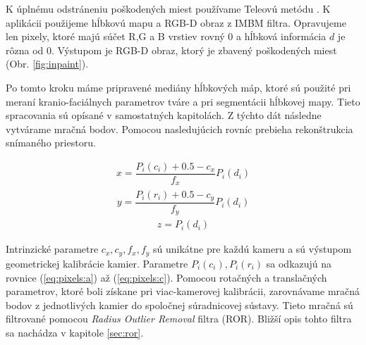 K úplnému odstráneniu poškodených miest používame Teleovú metódu \cite{telea2004image}. K aplikácii použijeme hĺbkovú mapu a RGB-D obraz z IMBM filtra. Opravujeme len pixely, ktoré majú súčet R,G a B vrstiev rovný 0 a hĺbková informácia $d$ je rôzna od 0. Výstupom je RGB-D obraz, ktorý je zbavený poškodených miest (Obr. \ref{fig:inpaint}).

Po tomto kroku máme pripravené mediány hĺbkových máp, ktoré sú použité pri meraní kranio-faciálnych parametrov tváre a pri segmentácii hĺbkovej mapy. Tieto spracovania sú opísané v samostatných kapitolách. Z týchto dát následne vytvárame mračná bodov. Pomocou nasledujúcich rovníc prebieha rekonštrukcia snímaného priestoru. 

\begin{equation}
\label{eq:project:x}
\begin{aligned}
x=\dfrac{P_{i}(c_{i})+0.5-c_{x}}{f_{x}}P_{i}(d_{i})
\end{aligned}
\end{equation}
\begin{equation}
\label{eq:project:y}
\begin{aligned}
y=\dfrac{P_{i}(r_{i})+0.5-c_{y}}{f_{y}}P_{i}(d_{i})
\end{aligned}
\end{equation}
\begin{equation}
\label{eq:project:z}
\begin{aligned}
z=P_{i}(d_{i})
\end{aligned}
\end{equation}

Intrinzické parametre $c_x, c_y, f_x, f_y$ sú unikátne pre každú kameru a sú výstupom geometrickej kalibrácie kamier. Parametre $P_i(c_i),P_i(r_i)$ sa odkazujú na rovnice (\ref{eq:pixels:a}) až (\ref{eq:pixels:c}). Pomocou rotačných a translačných parametrov, ktoré boli získane pri viac-kamerovej kalibrácii, zarovnávame mračná bodov z jednotlivých kamier do spoločnej súradnicovej sústavy. Tieto mračná sú filtrované pomocou \textit{Radius Outlier Removal} filtra (ROR). Bližší opis tohto filtra sa nachádza v kapitole \ref{sec:ror}. 


